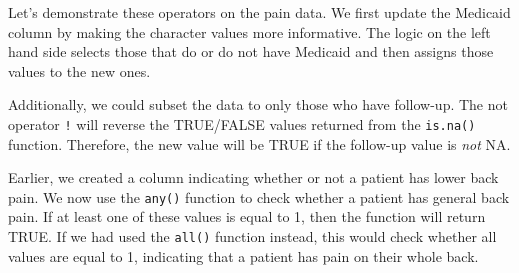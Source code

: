 \documentclass[
  letterpaper,
]{krantz}
\makeatletter
\newenvironment{Shaded}{\begin{snugshade}}{\end{snugshade}}
\newcommand{\CommentTok}[1]{\textcolor[rgb]{0.37,0.37,0.37}{#1}}
\newcommand{\DecValTok}[1]{\textcolor[rgb]{0.68,0.00,0.00}{#1}}
\newcommand{\FunctionTok}[1]{\textcolor[rgb]{0.28,0.35,0.67}{#1}}
\newcommand{\NormalTok}[1]{\textcolor[rgb]{0.00,0.23,0.31}{#1}}
\newcommand{\OtherTok}[1]{\textcolor[rgb]{0.00,0.23,0.31}{#1}}
\newcommand{\SpecialCharTok}[1]{\textcolor[rgb]{0.37,0.37,0.37}{#1}}
\newcommand{\StringTok}[1]{\textcolor[rgb]{0.13,0.47,0.30}{#1}}
\newenvironment{kframe}{%
\medskip{}
\setlength{\fboxsep}{.8em}
 \def\at@end@of@kframe{}%
 \ifinner\ifhmode%
  \def\at@end@of@kframe{\end{minipage}}%
  \begin{minipage}{\columnwidth}%
 \fi\fi%
 \def\FrameCommand##1{\hskip\@totalleftmargin \hskip-\fboxsep
 \colorbox{shadecolor}{##1}\hskip-\fboxsep
     \hskip-\linewidth \hskip-\@totalleftmargin \hskip\columnwidth}%
 \MakeFramed {\advance\hsize-\width
   \@totalleftmargin\z@ \linewidth\hsize
   \@setminipage}}%
 {\par\unskip\endMakeFramed%
 \at@end@of@kframe}
\renewenvironment{Shaded}{\begin{kframe}}{\end{kframe}}
\makeatother
\begin{document}
Let's demonstrate these operators on the pain data. We first update the
Medicaid column by making the character values more informative. The
logic on the left hand side selects those that do or do not have
Medicaid and then assigns those values to the new ones.

\begin{Shaded}
\end{Shaded}

Additionally, we could subset the data to only those who have follow-up.
The not operator \texttt{!} will reverse the TRUE/FALSE values returned
from the \texttt{is.na()} function. Therefore, the new value will be
TRUE if the follow-up value is \emph{not} NA.

\begin{Shaded}
\end{Shaded}

Earlier, we created a column indicating whether or not a patient has
lower back pain. We now use the \texttt{any()} function to check whether
a patient has general back pain. If at least one of these values is
equal to 1, then the function will return TRUE. If we had used the
\texttt{all()} function instead, this would check whether all values are
equal to 1, indicating that a patient has pain on their whole back.

\begin{Shaded}
\end{Shaded}
\end{document}
